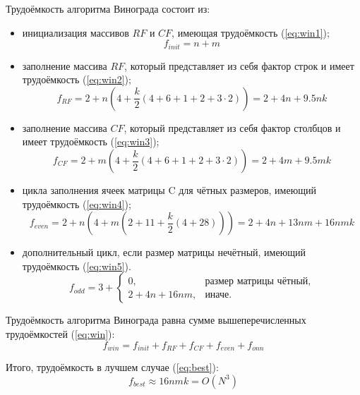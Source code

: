 Трудоёмкость алгоритма Винограда состоит из:
\begin{itemize}
    \item инициализация массивов $RF$ и $CF$, имеющая трудоёмкость (\ref{eq:win1});
        \begin{equation}
            \label{eq:win1}
            f_{init} = n + m
        \end{equation}
	\item заполнение массива $RF$, который представляет из себя фактор строк и имеет трудоёмкость (\ref{eq:win2});
        \begin{equation}
            \label{eq:win2}
            f_{RF} = 2 + n(4 + \frac{k}{2}(4 + 6 + 1 + 2 + 3 \cdot 2)) = 2 + 4n + 9.5nk
        \end{equation}
	\item заполнение массива $CF$, который представляет из себя фактор столбцов и имеет трудоёмкость (\ref{eq:win3});
        \begin{equation}
            \label{eq:win3}
            f_{CF} = 2 + m(4 + \frac{k}{2}(4 + 6 + 1 + 2 + 3 \cdot 2)) = 2 + 4m + 9.5mk
        \end{equation}
	\item цикла заполнения ячеек матрицы C для чётных размеров, имеющий трудоёмкость (\ref{eq:win4});
        \begin{equation}
            \label{eq:win4}
            f_{even} = 2 + n(4 + m(2 + 11 + \frac{k}{2}(4 + 28))) = 2 + 4n + 13nm + 16nmk
        \end{equation}
    \item дополнительный цикл, если размер матрицы нечётный, имеющий трудоёмкость (\ref{eq:win5}).
        \begin{equation}
            \label{eq:win5}
            f_{odd} = 3 +
            \begin{cases}
            0, & \text{размер матрицы чётный,}\\
            2 + 4n + 16nm, & \text{иначе.}
            \end{cases}
        \end{equation}
\end{itemize}

Трудоёмкость алгоритма Винограда равна сумме вышеперечисленных трудоёмкостей (\ref{eq:win}):
\begin{equation}
    \label{eq:win}
    f_{win} = f_{init} + f_{RF} + f_{CF} + f_{even} + f_{onn}
\end{equation}

Итого, трудоёмкость в лучшем случае (\ref{eq:best}):
\begin{equation}
    \label{eq:best}
    f_{best} \approx 16nmk = O(N^3)
\end{equation}

